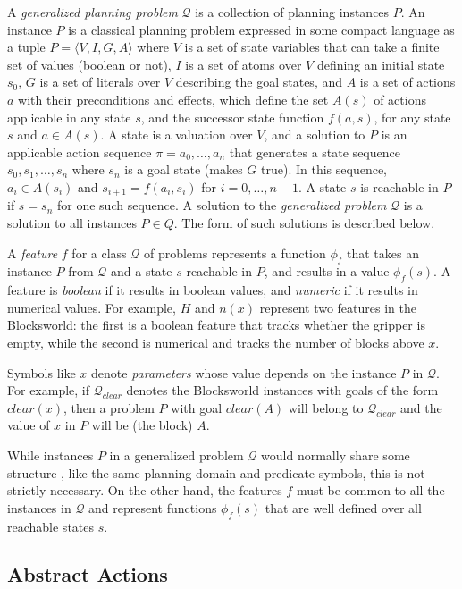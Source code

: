 \documentclass[letterpaper]{article} %
\newcommand{\tup}[1]{\langle #1 \rangle}
\newcommand{\Q}{\mathcal{Q}}
\begin{document}
A \emph{generalized planning problem} $\Q$ is a collection of planning instances $P$.
An instance $P$ is a  classical planning problem expressed in some compact language
as a tuple $P=\tup{V,I,G,A}$ where $V$ is a set of state variables that can take a
finite set of values (boolean or not), $I$ is a set of atoms over $V$ defining an
initial state $s_0$, $G$ is a set of literals over $V$ describing the goal
states, and $A$ is a set of actions $a$ with their preconditions and effects, which
define the set $A(s)$ of actions applicable in any state $s$, and the successor
state function $f(a,s)$, for any state $s$ and $a \in A(s)$.
A state is a valuation over $V$, and a solution to $P$ is an applicable action
sequence $\pi=a_0,\ldots,a_n$ that generates  a state sequence $s_0,s_1,\ldots,s_{n}$
where $s_n$ is a goal state (makes $G$ true). In this sequence, $a_i \in A(s_i)$
and $s_{i+1}=f(a_i,s_i)$ for $i=0, \ldots, n-1$. A state $s$ is reachable in $P$
if $s=s_n$ for one such sequence. A solution to the \emph{generalized problem}
$\Q$ is a solution to all instances $P \in Q$. The form of such solutions is
described below.

A \emph{feature} $f$ for a class $\Q$ of problems represents a function $\phi_f$
that takes an instance $P$ from $\Q$ and a state $s$ reachable in $P$, and results
in a value $\phi_f(s)$.
A feature is \emph{boolean} if it results in boolean values, and \emph{numeric}
if it results in numerical values. %
For example, $H$ and $n(x)$ represent two features in the Blocksworld:
the first is a boolean feature that tracks whether the gripper is empty, while
the second is numerical and tracks the number of blocks above $x$.

Symbols like $x$ denote \emph{parameters} whose value depends on the
instance $P$ in $\Q$. For example, if $\Q_{clear}$ denotes the Blocksworld
instances with goals of the form $clear(x)$, then a problem
$P$ with goal $clear(A)$ will belong to $\Q_{clear}$ and
the value of $x$ in $P$ will be (the block) $A$.

While instances $P$ in a generalized problem $\Q$ would normally share some structure \cite{bonet:ijcai2015},
like the same planning domain and predicate symbols, this is not strictly  necessary.
On the other hand,  the features $f$  must be common to all the instances  in $\Q$ and
represent functions $\phi_f(s)$ that are well defined over all reachable states $s$.


\subsection{Abstract Actions}
\end{document}
